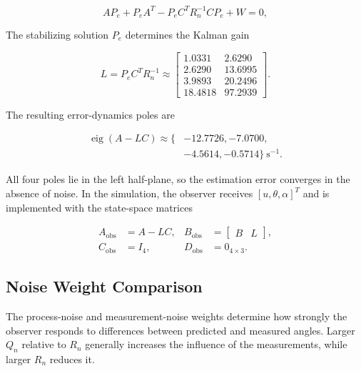 \documentclass[conference]{IEEEtran}
\newcommand{\eig}{\operatorname{eig}}
\begin{document}
\begin{equation}
AP_e+P_eA^T-P_eC^TR_n^{-1}CP_e+W=0,
\label{eq:estcare}
\end{equation}

The stabilizing solution $P_e$ determines the Kalman gain

\begin{equation}
L=P_eC^TR_n^{-1}\approx
\begin{bmatrix}
1.0331&2.6290\\2.6290&13.6995\\
3.9893&20.2496\\18.4818&97.2939
\end{bmatrix}.
\label{eq:L}
\end{equation}

The resulting error-dynamics poles are

\begin{equation}
\begin{split}
\eig(A-LC)\approx\{&-12.7726,-7.0700,\\
&-4.5614,-0.5714\}\ \mathrm{s}^{-1}.
\end{split}
\label{eq:obspoles}
\end{equation}

All four poles lie in the left half-plane, so the estimation error converges in the absence of noise. In the simulation, the observer receives $[u,\theta,\alpha]^T$ and is implemented with the state-space matrices

\begin{equation}
\begin{aligned}
A_{\mathrm{obs}}&=A-LC,& B_{\mathrm{obs}}&=\begin{bmatrix}B&L\end{bmatrix},\\
C_{\mathrm{obs}}&=I_4,& D_{\mathrm{obs}}&=0_{4\times3}.
\end{aligned}
\label{eq:obsimplementation}
\end{equation}

\subsection{Noise Weight Comparison}

The process-noise and measurement-noise weights determine how strongly the observer responds to differences between predicted and measured angles. Larger $Q_n$ relative to $R_n$ generally increases the influence of the measurements, while larger $R_n$ reduces it.
\end{document}
